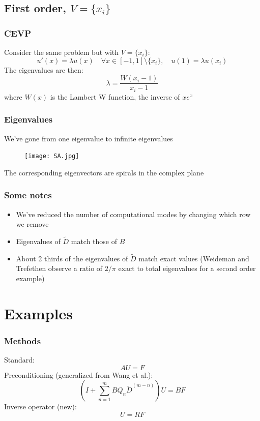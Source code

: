 \documentclass{beamer}
\begin{document}
\subsection{First order, $V = \{x_i\}$}

\begin{frame}
\frametitle{CEVP}
Consider the same problem but with $V = \{ x_i \}$:
\begin{equation*}
u'(x) = \lambda u(x) \quad \forall x \in [-1,1]\setminus \{x_i\}, \quad u(1) = \lambda u(x_i)
\end{equation*}
The eigenvalues are then:
\begin{equation*}
\lambda = \frac{W(x_i - 1)}{x_i - 1}
\end{equation*}
where $W(x)$ is the Lambert W function, the inverse of $x e^x$
\end{frame}

\begin{frame}
\frametitle{Eigenvalues}
We've gone from one eigenvalue to infinite eigenvalues
\begin{figure}
\texttt{[image: SA.jpg]}
\end{figure}
The corresponding eigenvectors are spirals in the complex plane
\end{frame}

\begin{frame}
\frametitle{Some notes}
\begin{itemize}
\item We've reduced the number of computational modes by changing which row we remove
\item Eigenvalues of $\tilde{D}$ match those of $B$
\item About 2 thirds of the eigenvalues of $\tilde{D}$ match exact values (Weideman and Trefethen observe a ratio of $2/\pi$ exact to total eigenvalues for a second order example)
\end{itemize}
\end{frame}

\section{Examples}

\begin{frame}
\frametitle{Methods}
Standard:
\begin{equation*}
A U = F
\end{equation*}
Preconditioning (generalized from Wang et al.):
\begin{equation*}
\left ( I + \sum_{n=1}^m B Q_n \tilde{D}^{(m-n)} \right ) U = B F
\end{equation*}
Inverse operator (new):
\begin{equation*}
U = R F
\end{equation*}
\end{frame}
\end{document}
